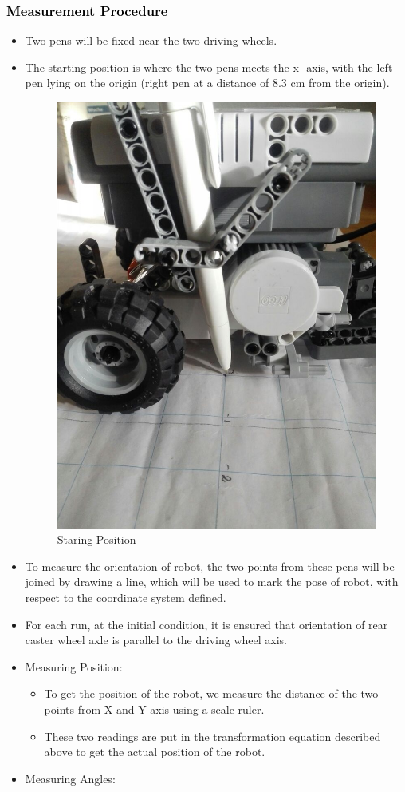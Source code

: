 \documentclass[10pt,a4paper]{article}
\begin{document}
					\subsubsection{\textcolor{black}{Measurement Procedure}}
					\begin{itemize}
						\item Two pens will be fixed near the two driving wheels.
						\item The starting position is where the two pens meets the x -axis, with the left pen lying on the origin (right pen at a distance of  8.3 cm from the origin).			
						\begin{figure}[h]
							\centering
							\includegraphics[width=0.4\linewidth]{img/starting-pt.jpeg}
							\caption{Staring Position}
							\label{fig:startingView}
						\end{figure}
						\item To measure the orientation of robot, the two points from these pens will be joined by drawing a line, which will be used to mark the pose of robot, with respect to the coordinate system defined.
						\item For each run, at the initial condition, it is ensured that orientation of rear caster wheel axle is parallel to the driving wheel axis.
						\item Measuring Position:
							\begin{itemize}
								\item To get the position of the robot, we measure the distance of the two points from X and Y axis using a scale ruler.
								\item These two readings are put in the transformation equation described above to get the actual position of the robot.
							\end{itemize}
						\item Measuring Angles:
							\begin{itemize}

\end{itemize}
\end{itemize}
\end{document}
